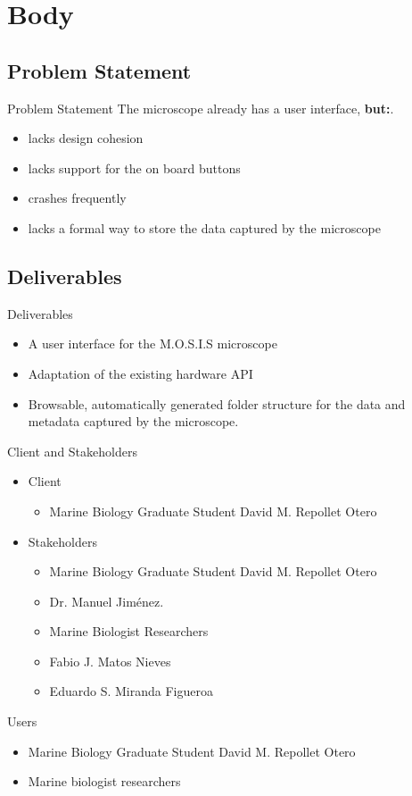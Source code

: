 \documentclass[14pt, aspectratio=169]{beamer}
\begin{document}
\section{Body}
\subsection{Problem Statement}
\begin{frame}{Problem Statement}
	The microscope already has a user interface, \textbf{but:}.
	\begin{itemize}
		\item lacks design cohesion
		\item lacks support for the on board buttons
		\item crashes frequently
		\item lacks a formal way to store the data captured by the microscope
	\end{itemize}
\end{frame}
\subsection{Deliverables}
\begin{frame}{Deliverables}
	\begin{itemize}
		\item A user interface for the M.O.S.I.S microscope
		\item Adaptation of the existing hardware API
		\item Browsable, automatically generated folder structure for the data and metadata captured by the microscope.
	\end{itemize}
\end{frame}
\begin{frame}{Client and Stakeholders}
	\begin{itemize}
		\item Client
		      \begin{itemize}
			      \item Marine Biology Graduate Student David M. Repollet Otero
		      \end{itemize}
		\item Stakeholders
		      \begin{itemize}
			      \item Marine Biology Graduate Student David M. Repollet Otero
			      \item Dr. Manuel Jiménez.
			      \item Marine Biologist Researchers
			      \item Fabio J. Matos Nieves
			      \item Eduardo S. Miranda Figueroa
		      \end{itemize}
	\end{itemize}
\end{frame}
\begin{frame}{Users}
	\begin{itemize}
		\item Marine Biology Graduate Student David M. Repollet Otero
		\item Marine biologist researchers
	\end{itemize}
\end{frame}
\end{document}
